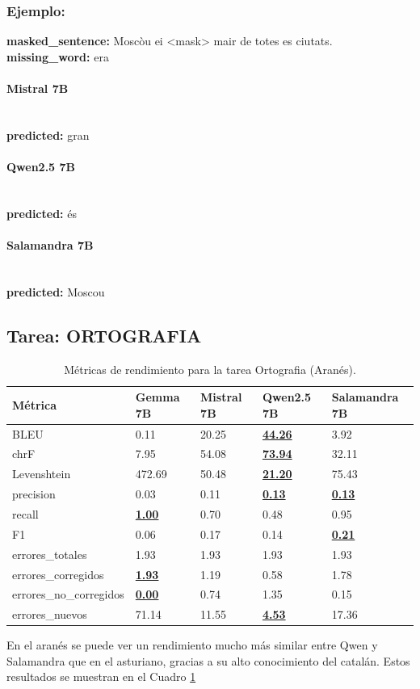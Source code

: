 \subsubsection{Ejemplo:}
\textbf{masked\_sentence:} Moscòu ei {\textless}mask{\textgreater} mair de totes es ciutats.\\
\textbf{missing\_word:} era

\paragraph{Mistral 7B}~\\
\textbf{predicted:} gran

\paragraph{Qwen2.5 7B}~\\
\textbf{predicted:} és

\paragraph{Salamandra 7B}~\\
\textbf{predicted:} Moscou

\subsection{Tarea: ORTOGRAFIA}\label{tarea-ortografia}
\begin{longtable}[]{@{}lllll@{}}
\toprule\noalign{}
Métrica & Gemma 7B & Mistral 7B & Qwen2.5 7B & Salamandra 7B \\
\midrule\noalign{}
\endhead
\bottomrule\noalign{}
\caption{Métricas de rendimiento para la tarea Ortografia (Aranés).} 
\label{tab:metricas_ortografia_Aranés}
\endlastfoot
BLEU & 0.11 & 20.25 & \textbf{\underline{44.26}} & 3.92 \\
chrF & 7.95 & 54.08 & \textbf{\underline{73.94}} & 32.11 \\
Levenshtein & 472.69 & 50.48 & \textbf{\underline{21.20}} & 75.43 \\
precision & 0.03 & 0.11 & \textbf{\underline{0.13}} & \textbf{\underline{0.13}} \\
recall & \textbf{\underline{1.00}} & 0.70 & 0.48 & 0.95 \\
F1 & 0.06 & 0.17 & 0.14 & \textbf{\underline{0.21}} \\
errores\_totales & 1.93 & 1.93 & 1.93 & 1.93 \\
errores\_corregidos & \textbf{\underline{1.93}} & 1.19 & 0.58 & 1.78 \\
errores\_no\_corregidos & \textbf{\underline{0.00}} & 0.74 & 1.35 & 0.15 \\
errores\_nuevos & 71.14 & 11.55 & \textbf{\underline{4.53}} & 17.36 \\
\end{longtable}
En el aranés se puede ver un rendimiento mucho más similar entre Qwen y Salamandra que en el asturiano, gracias a su alto conocimiento del catalán. Estos resultados se muestran en el Cuadro \ref{tab:metricas_ortografia_Aranés}

